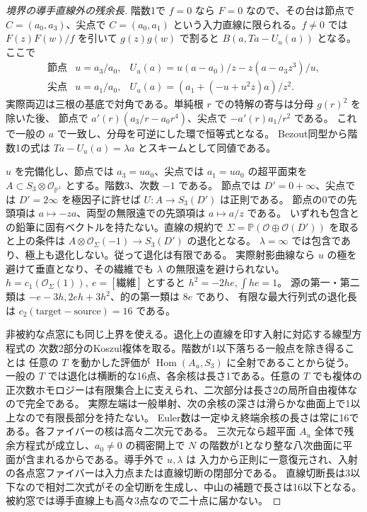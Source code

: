 \begin{proof}[境界の導手直線外の残余長]
階数1で $f=0$ なら $F=0$ なので、その台は節点で $C=(a_0,a_3)$、尖点で
$C=(a_0,a_1)$ という入力直線に限られる。$f\ne0$ では $F(z)F(w)/f$ を引いて
$g(z)g(w)$ で割ると $B(a,Ta-U_u(a))$ となる。ここで
\[
\begin{array}{lll}
\text{節点}& u=a_3/a_0,& U_u(a)=u(a-a_0)/z-z(a-a_3z^3)/u,\\
\text{尖点}& u=a_1/a_0,& U_u(a)=(a_1+(-u+u^2z)a)/z^2 .
\end{array}
\]
実際両辺は三根の基底で対角である。単純根 $r$ での特解の寄与は分母 $g(r)^2$ を除いた後、
節点で $a'(r)(a_3/r-a_0r^4)$、尖点で $-a'(r)a_1/r^2$ である。
これで一般の $a$ で一致し、分母を可逆にした環で恒等式となる。
Bezout同型から階数1の式は $Ta-U_u(a)=\lambda a$ とスキームとして同値である。

$u$ を完備化し、節点では $a_3=u a_0$、尖点では $a_1=u a_0$ の超平面束を
$A\subset S_3\otimes\mathcal O_{\mathbb P^1}$ とする。階数3、次数 $-1$ である。
節点では $D'=0+\infty$、尖点では $D'=2\infty$ を極因子に許せば $U:A\to S_3(D')$ は正則である。
節点の0での先頭項は $a\mapsto-za$、両型の無限遠での先頭項は $a\mapsto a/z$ である。
いずれも包含との鉛筆に固有ベクトルを持たない。直線の規約で
$\Sigma=\mathbb P(\mathcal O\oplus\mathcal O(D'))$ を取ると上の条件は
$A\otimes\mathcal O_\Sigma(-1)\to S_3(D')$ の退化となる。
$\lambda=\infty$ では包含であり、極上も退化しない。従って退化は有限である。
実際射影曲線なら $u$ の極を避けて垂直となり、その繊維でも $\lambda$ の無限遠を避けられない。
$h=c_1(\mathcal O_\Sigma(1)),\ e=[\text{繊維}]$ とすると $h^2=-2he,\int he=1$。
源の第一・第二類は $-e-3h,2eh+3h^2$、的の第一類は $8e$ であり、
有限な最大行列式の退化長は $c_2(\mathrm{target}-\mathrm{source})=16$ である。

非被約な点窓にも同じ上界を使える。退化上の直線を印す入射に対応する線型方程式の
次数2部分のKoszul複体を取る。階数が1以下落ちる一般点を除き得ることは
任意の $T$ を動かした評価が $\operatorname{Hom}(A_u,S_3)$ に全射であることから従う。
一般の $T$ では退化は横断的な16点、各余核は長さ1である。任意の $T$ でも複体の
正次数ホモロジーは有限集合上に支えられ、二次部分は長さ2の局所自由複体なので完全である。
実際左端は一般単射、次の余核の深さは滑らかな曲面上で1以上なので有限長部分を持たない。
Euler数は一定ゆえ終端余核の長さは常に16である。各ファイバーの核は高々二次元である。
三次元なら超平面 $A_u$ 全体で残余方程式が成立し、$a_0\ne0$ の稠密開上で
$N$ の階数が1となり整な八次曲面に平面が含まれるからである。導手外で $u,\lambda$ は
入力から正則に一意復元され、入射の各点窓ファイバーは入力点または直線切断の閉部分である。
直線切断長は3以下なので相対二次式がその全切断を生成し、中山の補題で長さは16以下となる。
被約窓では導手直線上も高々3点なので二十点に届かない。
\end{proof}


